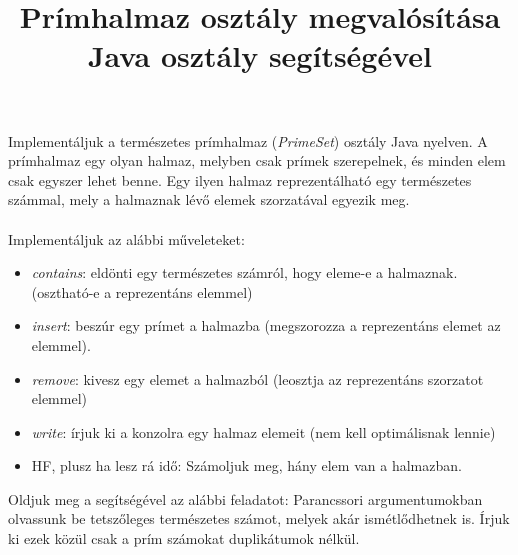 \documentclass[12pt,a4paper]{article}
\title{Prímhalmaz osztály megvalósítása Java osztály segítségével}
\begin{document}
Implementáljuk a természetes prímhalmaz (\textit{PrimeSet}) osztály Java nyelven. A prímhalmaz egy olyan halmaz, melyben csak prímek szerepelnek, és minden elem csak egyszer lehet benne. Egy ilyen halmaz reprezentálható egy természetes számmal, mely a halmaznak lévő elemek szorzatával egyezik meg. \\\\ 

Implementáljuk az alábbi műveleteket:
\begin{itemize}
\item \textit{contains}: eldönti egy természetes számról, hogy eleme-e a halmaznak. (osztható-e a reprezentáns elemmel)
\item \textit{insert}: beszúr egy prímet a halmazba (megszorozza a reprezentáns elemet az elemmel).
\item \textit{remove}: kivesz egy elemet a halmazból (leosztja az reprezentáns szorzatot elemmel)
\item \textit{write}:  írjuk ki a konzolra egy halmaz elemeit (nem kell optimálisnak lennie)
\item HF, plusz ha lesz rá idő: Számoljuk meg, hány elem van a halmazban.
\end{itemize} 

Oldjuk meg a segítségével az alábbi feladatot: Parancssori argumentumokban olvassunk be tetszőleges természetes számot, melyek akár ismétlődhetnek is. Írjuk ki ezek közül csak a prím számokat duplikátumok nélkül.
\end{document}

